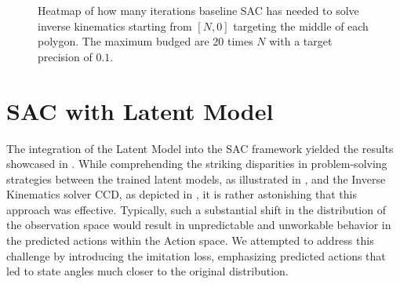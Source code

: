 \begin{figure}
    \begin{center}
        \hfill
        \hfill
    \end{center}
    \caption[SAC iteration heatmap]{Heatmap of how many iterations baseline SAC has needed to solve inverse kinematics starting from $[N, 0]$ targeting the middle of each polygon. The maximum budged are 20 times $N$ with a target precision of $0.1$.}
    \label{fig:SAC_baseline_min_distance_step}
\end{figure}

\section{SAC with Latent Model}

The integration of the Latent Model into the SAC framework yielded the results showcased in . While comprehending the striking disparities in problem-solving strategies between the trained latent models, as illustrated in , and the Inverse Kinematics solver CCD, as depicted in , it is rather astonishing that this approach was effective. Typically, such a substantial shift in the distribution of the observation space would result in unpredictable and unworkable behavior in the predicted actions within the Action space. We attempted to address this challenge by introducing the imitation loss, emphasizing predicted actions that led to state angles much closer to the original distribution.

